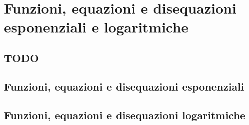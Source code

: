 
\chapter{Funzioni, equazioni e disequazioni esponenziali e logaritmiche}

\section{TODO}

\section{Funzioni, equazioni e disequazioni esponenziali}
\label{sec:01_esponenziali}

% 

\section{Funzioni, equazioni e disequazioni logaritmiche}
\label{sec:02_logaritmiche}

